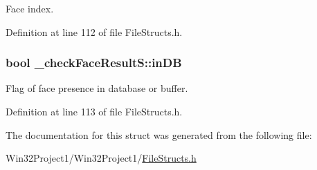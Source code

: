 Face index. 



Definition at line 112 of file File\+Structs.\+h.

\subsubsection[{\texorpdfstring{in\+DB}{inDB}}]{\setlength{\rightskip}{0pt plus 5cm}bool \+\_\+check\+Face\+Result\+S\+::in\+DB}\hypertarget{struct__check_face_result_s_aa7353d6109af6ce0a9b2c8c07e09a48b}{}\label{struct__check_face_result_s_aa7353d6109af6ce0a9b2c8c07e09a48b}


Flag of face presence in database or buffer. 



Definition at line 113 of file File\+Structs.\+h.



The documentation for this struct was generated from the following file\+:\begin{DoxyCompactItemize}
\item 
Win32\+Project1/\+Win32\+Project1/\hyperlink{_file_structs_8h}{File\+Structs.\+h}\end{DoxyCompactItemize}

